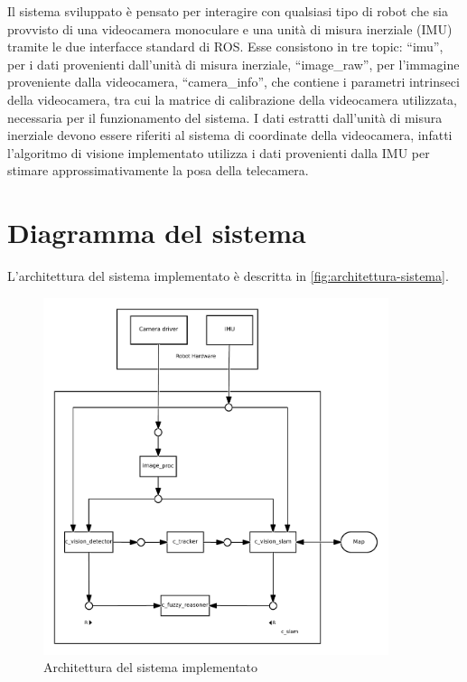 Il sistema sviluppato è pensato per interagire con qualsiasi tipo di robot che sia provvisto di una videocamera monoculare e una unità di misura inerziale (IMU) tramite le due interfacce standard di ROS.
Esse consistono in tre topic: ``imu'', per i dati provenienti dall'unità di misura inerziale, ``image\_raw'', per l'immagine proveniente dalla videocamera, ``camera\_info'', che contiene i parametri intrinseci della videocamera, tra cui la matrice di calibrazione della videocamera utilizzata, necessaria per il funzionamento del sistema.
I dati estratti dall'unità di misura inerziale devono essere riferiti al sistema di coordinate della videocamera, infatti l'algoritmo di visione implementato utilizza i dati provenienti dalla IMU per stimare approssimativamente la posa della telecamera.

\section{Diagramma del sistema}

L'architettura del sistema implementato è descritta in \autoref{fig:architettura-sistema}. \\
\begin{figure}[h]
  \includegraphics[width=0.9\textwidth]{diagrammi/Sistema}
  \caption{Architettura del sistema implementato}
  \label{fig:architettura-sistema}
\end{figure}


